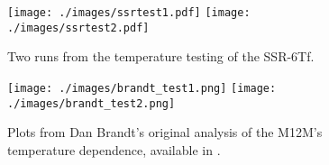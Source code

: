 
\begin{figure}[H]
\centering
\texttt{[image: ./images/ssrtest1.pdf]}
\texttt{[image: ./images/ssrtest2.pdf]}
\caption[SSR-6Tf Temperature Testing]{Two runs from the temperature testing of the
  SSR-6Tf.}
\label{ssrtemptest}
\end{figure}


\begin{figure}[H]
\centering
\texttt{[image: ./images/brandt\_test1.png]}
\texttt{[image: ./images/brandt\_test2.png]}
\caption[M12M Temperature Testing]{Plots from Dan Brandt's original analysis of the M12M's
  temperature dependence, available in \textcite{brandt}.}
\label{m12mtemptest}
\end{figure}
%
%
%
%

